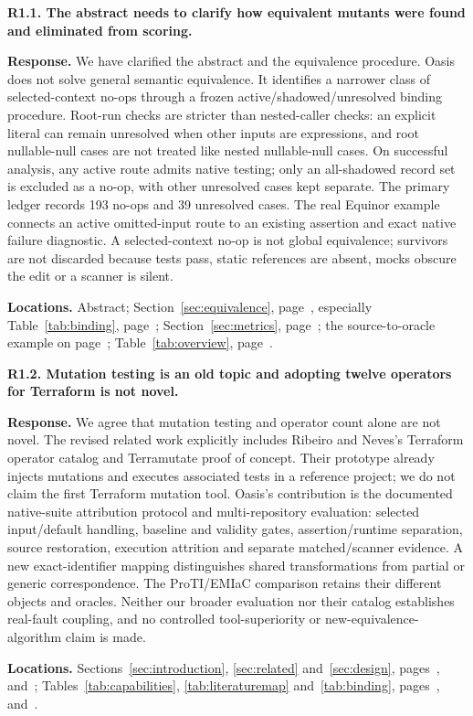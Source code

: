 \noindent\textbf{R1.1. The abstract needs to clarify how equivalent mutants were found and eliminated from scoring.}\label{response:R1.1}\par
\textbf{Response.} We have clarified the abstract and the equivalence procedure. Oasis does not solve general semantic equivalence. It identifies a narrower class of selected-context no-ops through a frozen active/shadowed/unresolved binding procedure. Root-run checks are stricter than nested-caller checks: an explicit literal can remain unresolved when other inputs are expressions, and root nullable-null cases are not treated like nested nullable-null cases. On successful analysis, any active route admits native testing; only an all-shadowed record set is excluded as a no-op, with other unresolved cases kept separate. The primary ledger records 193 no-ops and 39 unresolved cases. The real Equinor example connects an active omitted-input route to an existing assertion and exact native failure diagnostic. A selected-context no-op is not global equivalence; survivors are not discarded because tests pass, static references are absent, mocks obscure the edit or a scanner is silent.\par
\textbf{Locations.} Abstract; Section~\ref{sec:equivalence}, page~\pageref{sec:equivalence}, especially Table~\ref{tab:binding}, page~\pageref{tab:binding}; Section~\ref{sec:metrics}, page~\pageref{sec:metrics}; the source-to-oracle example on page~\pageref{sec:workedexample}; Table~\ref{tab:overview}, page~\pageref{tab:overview}.

\medskip
\noindent\textbf{R1.2. Mutation testing is an old topic and adopting twelve operators for Terraform is not novel.}\label{response:R1.2}\par
\textbf{Response.} We agree that mutation testing and operator count alone are not novel. The revised related work explicitly includes Ribeiro and Neves's Terraform operator catalog and Terramutate proof of concept. Their prototype already injects mutations and executes associated tests in a reference project; we do not claim the first Terraform mutation tool. Oasis's contribution is the documented native-suite attribution protocol and multi-repository evaluation: selected input/default handling, baseline and validity gates, assertion/runtime separation, source restoration, execution attrition and separate matched/scanner evidence. A new exact-identifier mapping distinguishes shared transformations from partial or generic correspondence. The ProTI/EMIaC comparison retains their different objects and oracles. Neither our broader evaluation nor their catalog establishes real-fault coupling, and no controlled tool-superiority or new-equivalence-algorithm claim is made.\par
\textbf{Locations.} Sections~\ref{sec:introduction}, \ref{sec:related} and~\ref{sec:design}, pages~\pageref{sec:introduction}, \pageref{sec:related} and~\pageref{sec:design}; Tables~\ref{tab:capabilities}, \ref{tab:literaturemap} and~\ref{tab:binding}, pages~\pageref{tab:capabilities}, \pageref{tab:literaturemap} and~\pageref{tab:binding}.


